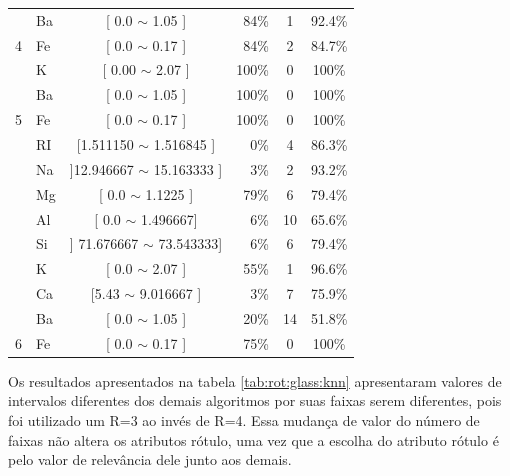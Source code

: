 \begin{table}[!h]
{\begin{tabular}{llcrcc}
                                            & Ba     & [ 0.0 $\sim$  1.05 ]    & 84\%  & 1  & 92.4\% \\  
\multirow{-5}{*}{4}                          & Fe    & [ 0.0 $\sim$  0.17 ]    & 84\%  & 2  & 84.7\% \\  \hline                                            
                                            & K     & [ 0.00 $\sim$  2.07 ]     & 100\%  & 0 & 100\% \\ 
                                            & Ba     & [ 0.0 $\sim$  1.05 ]    & 100\%  & 0 & 100\% \\  
\multirow{-3}{*}{5}                         & Fe    & [ 0.0 $\sim$  0.17 ]     & 100\%  & 0 & 100\% \\  \hline
                                            & RI     & [1.511150 $\sim$  1.516845 ] & 0\%  & 4  & 86.3\% \\ 
                                            & Na     & ]12.946667 $\sim$  15.163333 ] & 3\%  & 2  & 93.2\% \\ 
                                             & Mg    & [ 0.0 $\sim$  1.1225 ]    & 79\%  &6  & 79.4\%\\ 
                                             & Al    & [ 0.0 $\sim$  1.496667]      & 6\%  & 10  & 65.6\%\\
                                            & Si    & ] 71.676667 $\sim$  73.543333]      & 6\%  & 6  & 79.4\%\\
                                            & K     & [  0.0 $\sim$  2.07 ]    & 55\%  & 1  & 96.6\% \\ 
                                            & Ca     & [5.43 $\sim$ 9.016667 ]    & 3\%  & 7  & 75.9\% \\ 
                                            & Ba     & [ 0.0 $\sim$ 1.05 ]    & 20\%  & 14  & 51.8\% \\ 
\multirow{-9}{*}{6}                         & Fe    & [ 0.0 $\sim$  0.17 ]     & 75\%  & 0  & 100\% \\  \hline\hline

\end{tabular}
}
\end{table}


Os resultados apresentados na tabela \ref{tab:rot:glass:knn} apresentaram valores de intervalos diferentes dos demais algoritmos por suas faixas serem diferentes, pois foi utilizado um R=3 ao invés de R=4. Essa mudança de valor do número de faixas não altera os atributos rótulo, uma vez que a escolha do atributo rótulo é pelo valor de relevância dele junto aos demais. 

